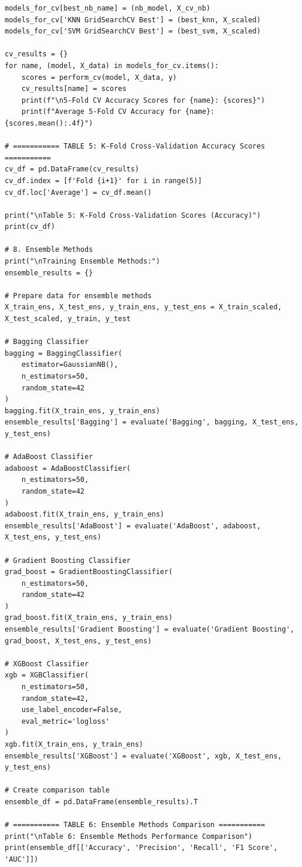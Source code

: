 \documentclass[12pt]{article}
\begin{document}
\begin{verbatim}
models_for_cv[best_nb_name] = (nb_model, X_cv_nb)
models_for_cv['KNN GridSearchCV Best'] = (best_knn, X_scaled)
models_for_cv['SVM GridSearchCV Best'] = (best_svm, X_scaled)

cv_results = {}
for name, (model, X_data) in models_for_cv.items():
    scores = perform_cv(model, X_data, y)
    cv_results[name] = scores
    print(f"\n5-Fold CV Accuracy Scores for {name}: {scores}")
    print(f"Average 5-Fold CV Accuracy for {name}: {scores.mean():.4f}")

# =========== TABLE 5: K-Fold Cross-Validation Accuracy Scores ===========
cv_df = pd.DataFrame(cv_results)
cv_df.index = [f'Fold {i+1}' for i in range(5)]
cv_df.loc['Average'] = cv_df.mean()

print("\nTable 5: K-Fold Cross-Validation Scores (Accuracy)")
print(cv_df)

# 8. Ensemble Methods
print("\nTraining Ensemble Methods:")
ensemble_results = {}

# Prepare data for ensemble methods
X_train_ens, X_test_ens, y_train_ens, y_test_ens = X_train_scaled, X_test_scaled, y_train, y_test

# Bagging Classifier
bagging = BaggingClassifier(
    estimator=GaussianNB(),
    n_estimators=50,
    random_state=42
)
bagging.fit(X_train_ens, y_train_ens)
ensemble_results['Bagging'] = evaluate('Bagging', bagging, X_test_ens, y_test_ens)

# AdaBoost Classifier
adaboost = AdaBoostClassifier(
    n_estimators=50,
    random_state=42
)
adaboost.fit(X_train_ens, y_train_ens)
ensemble_results['AdaBoost'] = evaluate('AdaBoost', adaboost, X_test_ens, y_test_ens)

# Gradient Boosting Classifier
grad_boost = GradientBoostingClassifier(
    n_estimators=50,
    random_state=42
)
grad_boost.fit(X_train_ens, y_train_ens)
ensemble_results['Gradient Boosting'] = evaluate('Gradient Boosting', grad_boost, X_test_ens, y_test_ens)

# XGBoost Classifier
xgb = XGBClassifier(
    n_estimators=50,
    random_state=42,
    use_label_encoder=False,
    eval_metric='logloss'
)
xgb.fit(X_train_ens, y_train_ens)
ensemble_results['XGBoost'] = evaluate('XGBoost', xgb, X_test_ens, y_test_ens)

# Create comparison table
ensemble_df = pd.DataFrame(ensemble_results).T

# =========== TABLE 6: Ensemble Methods Comparison ===========
print("\nTable 6: Ensemble Methods Performance Comparison")
print(ensemble_df[['Accuracy', 'Precision', 'Recall', 'F1 Score', 'AUC']])


\end{verbatim}
\end{document}
